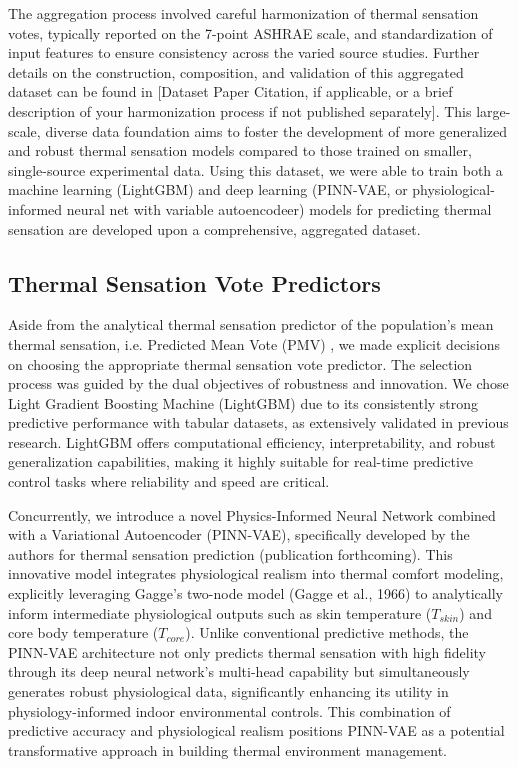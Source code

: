 The aggregation process involved careful harmonization of thermal sensation votes, typically reported on the 7-point ASHRAE scale, and standardization of input features to ensure consistency across the varied source studies. Further details on the construction, composition, and validation of this aggregated dataset can be found in [Dataset Paper Citation, if applicable, or a brief description of your harmonization process if not published separately]. This large-scale, diverse data foundation aims to foster the development of more generalized and robust thermal sensation models compared to those trained on smaller, single-source experimental data. Using this dataset, we were able to train both a machine learning (LightGBM) and deep learning (PINN-VAE, or physiological-informed neural net with variable autoencodeer) models for predicting thermal sensation are developed upon a comprehensive, aggregated dataset.

\subsection{Thermal Sensation Vote Predictors}\label{sec:comfort_models}
Aside from the analytical thermal sensation predictor of the population's mean thermal sensation, i.e. Predicted Mean Vote (PMV) \cite{Fanger1970}, we made explicit decisions on choosing the appropriate thermal sensation vote predictor. The selection process was guided by the dual objectives of robustness and innovation. We chose Light Gradient Boosting Machine (LightGBM) due to its consistently strong predictive performance with tabular datasets, as extensively validated in previous research\cite{Ke2017}. LightGBM offers computational efficiency, interpretability, and robust generalization capabilities, making it highly suitable for real-time predictive control tasks where reliability and speed are critical.

Concurrently, we introduce a novel Physics-Informed Neural Network combined with a Variational Autoencoder (PINN-VAE), specifically developed by the authors for thermal sensation prediction (publication forthcoming). This innovative model integrates physiological realism into thermal comfort modeling, explicitly leveraging Gagge's two-node model (Gagge et al., 1966) to analytically inform intermediate physiological outputs such as skin temperature ($T_{skin}$) and core body temperature ($T_{core}$). Unlike conventional predictive methods, the PINN-VAE architecture not only predicts thermal sensation with high fidelity through its deep neural network’s multi-head capability but simultaneously generates robust physiological data, significantly enhancing its utility in physiology-informed indoor environmental controls. This combination of predictive accuracy and physiological realism positions PINN-VAE as a potential transformative approach in building thermal environment management.

